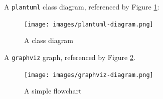 \documentclass[a4paper, ]{article}
\begin{document}
    A \texttt{plantuml} class diagram, referenced by Figure
    \ref{fig:plantuml-diagram}:

    \begin{figure}[H]
        \centering
        \texttt{[image: images/plantuml-diagram.png]}
        \caption{A class diagram}
        \label{fig:plantuml-diagram}
    \end{figure}

    A \texttt{graphviz} graph, referenced by Figure
    \ref{fig:graphviz-diagram}.

    \begin{figure}[H]
        \centering
        \texttt{[image: images/graphviz-diagram.png]}
        \caption{A simple flowchart}
        \label{fig:graphviz-diagram}
    \end{figure}


    \clearpage
    
    
    
    \clearpage
    \printglossary[type=\acronymtype]
    \clearpage
    \printglossary
\end{document}
